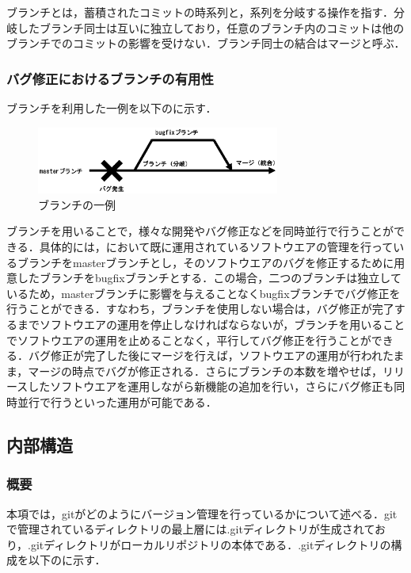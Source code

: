 \documentclass[a4j,9pt,twocolumn]{jsarticle}
\begin{document}
ブランチとは，蓄積されたコミットの時系列と，系列を分岐する操作を指す．分岐したブランチ同士は互いに独立しており，任意のブランチ内のコミットは他のブランチでのコミットの影響を受けない．ブランチ同士の結合はマージと呼ぶ．

\subsubsection{バグ修正におけるブランチの有用性}
ブランチを利用した一例を以下のに示す．

\begin{figure}[h]
\centering
\includegraphics[width=80mm]{img/branch.eps}
\caption{ブランチの一例}
\label{branch_ex}
\end{figure}

ブランチを用いることで，様々な開発やバグ修正などを同時並行で行うことができる．具体的には，において既に運用されているソフトウエアの管理を行っているブランチをmasterブランチとし，そのソフトウエアのバグを修正するために用意したブランチをbugfixブランチとする．この場合，二つのブランチは独立しているため，masterブランチに影響を与えることなくbugfixブランチでバグ修正を行うことができる．すなわち，ブランチを使用しない場合は，バグ修正が完了するまでソフトウエアの運用を停止しなければならないが，ブランチを用いることでソフトウエアの運用を止めることなく，平行してバグ修正を行うことができる．バグ修正が完了した後にマージを行えば，ソフトウエアの運用が行われたまま，マージの時点でバグが修正される．さらにブランチの本数を増やせば，リリースしたソフトウエアを運用しながら新機能の追加を行い，さらにバグ修正も同時並行で行うといった運用が可能である．

\subsection{内部構造}
\subsubsection{概要}
本項では，gitがどのようにバージョン管理を行っているかについて述べる．gitで管理されているディレクトリの最上層には.gitディレクトリが生成されており，.gitディレクトリがローカルリポジトリの本体である\cite{mecha}．.gitディレクトリの構成を以下のに示す．
\end{document}
